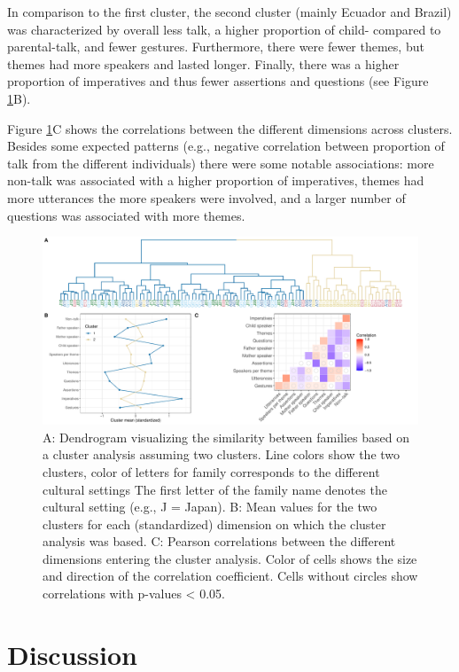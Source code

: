 \documentclass[
  man,floatsintext]{apa6}
\begin{document}
In comparison to the first cluster, the second cluster (mainly Ecuador and Brazil) was characterized by overall less talk, a higher proportion of child- compared to parental-talk, and fewer gestures. Furthermore, there were fewer themes, but themes had more speakers and lasted longer. Finally, there was a higher proportion of imperatives and thus fewer assertions and questions (see Figure \ref{fig:fig4}B).

Figure \ref{fig:fig4}C shows the correlations between the different dimensions across clusters. Besides some expected patterns (e.g., negative correlation between proportion of talk from the different individuals) there were some notable associations: more non-talk was associated with a higher proportion of imperatives, themes had more utterances the more speakers were involved, and a larger number of questions was associated with more themes.

\begin{figure}
\includegraphics[width=1\linewidth]{../visuals/fig4} \caption{A: Dendrogram visualizing the similarity between families based on a cluster analysis assuming two clusters. Line colors show the two clusters, color of letters for family corresponds to the different cultural settings The first letter of the family name denotes the cultural setting (e.g., J = Japan). B: Mean values for the two clusters for each (standardized) dimension on which the cluster analysis was based. C: Pearson correlations between the different dimensions entering the cluster analysis. Color of cells shows the size and direction of the correlation coefficient. Cells without circles show correlations with p-values < 0.05.}\label{fig:fig4}
\end{figure}

\hypertarget{discussion}{%
\section{Discussion}\label{discussion}}
\end{document}
